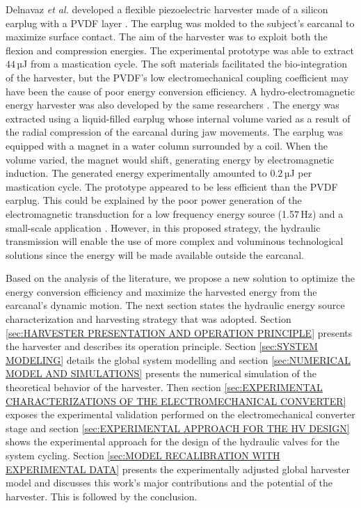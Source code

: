 \documentclass[3p,twocolumn,preprint]{elsarticle}
\begin{document}
Delnavaz \emph{et al.} developed a flexible piezoelectric harvester made of a silicon earplug with a PVDF layer \cite{Delnavaz2013}. The earplug was molded to the subject's earcanal to maximize surface contact. The aim of the harvester was to exploit both the flexion and compression energies. The experimental prototype was able to extract $44$\,µJ from a mastication cycle. The soft materials facilitated the bio-integration of the harvester, but the PVDF's low electromechanical coupling coefficient may have been the cause of poor energy conversion efficiency. A hydro-electromagnetic energy harvester was also developed by the same researchers \cite{Delnavaz2012}. The energy was extracted using a liquid-filled earplug whose internal volume varied as a result of the radial compression of the earcanal during jaw movements. The earplug was equipped with a magnet in a water column surrounded by a coil. When the volume varied, the magnet would shift, generating energy by electromagnetic induction. The generated energy experimentally amounted to $0.2$\,µJ per mastication cycle. The prototype appeared to be less efficient than the PVDF earplug. This could be explained by the poor power generation of the electromagnetic transduction for a low frequency energy source (1.57\,Hz) and a small-scale application \cite{Kulah2008,Priya2017}. However, in this proposed strategy, the hydraulic transmission will enable the use of more complex and voluminous technological solutions since the energy will be made available outside the earcanal.

Based on the analysis of the literature, we propose a new solution to optimize the energy conversion efficiency and maximize the harvested energy from the earcanal's dynamic motion. The next section states the hydraulic energy source characterization and harvesting strategy that was adopted. Section \ref{sec:HARVESTER PRESENTATION AND OPERATION PRINCIPLE} presents the harvester and describes its operation principle. Section \ref{sec:SYSTEM MODELING} details the global system modelling and section \ref{sec:NUMERICAL MODEL AND SIMULATIONS} presents the numerical simulation of the theoretical behavior of the harvester. Then section \ref{sec:EXPERIMENTAL CHARACTERIZATIONS OF THE ELECTROMECHANICAL CONVERTER} exposes the experimental validation performed on the electromechanical converter stage and section \ref{sec:EXPERIMENTAL APPROACH FOR THE HV DESIGN} shows the experimental approach for the design of the hydraulic valves for the system cycling. Section \ref{sec:MODEL RECALIBRATION WITH EXPERIMENTAL DATA} presents the experimentally adjusted global harvester model and discusses this work's major contributions and the potential of the harvester. This is followed by the conclusion.
\end{document}
